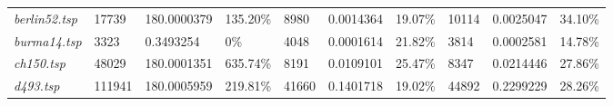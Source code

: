 \begin{landscape}
\begin{table}[]
\begin{tabular}{llllllllll}
  \textit{berlin52.tsp}                                 & 17739                                  & 180.0000379                                                                          & 135.20\%                                                                               & 8980                                   & 0.0014364                                                                             & 19.07\%                                                                                & 10114                                  & 0.0025047                                                                            & 34.10\%                                                                                \\
  \textit{burma14.tsp}                                  & 3323                                   & 0.3493254                                                                            & 0\%                                                                                    & 4048                                   & 0.0001614                                                                             & 21.82\%                                                                                & 3814                                   & 0.0002581                                                                            & 14.78\%                                                                                \\
  \textit{ch150.tsp}                                    & 48029                                  & 180.0001351                                                                          & 635.74\%                                                                               & 8191                                   & 0.0109101                                                                             & 25.47\%                                                                                & 8347                                   & 0.0214446                                                                            & 27.86\%                                                                                \\
  \textit{d493.tsp}                                     & 111941                                 & 180.0005959                                                                          & 219.81\%                                                                               & 41660                                  & 0.1401718                                                                             & 19.02\%                                                                                & 44892                                  & 0.2299229                                                                            & 28.26\%                                                                                \\

\end{tabular}
\end{table}
\end{landscape}
